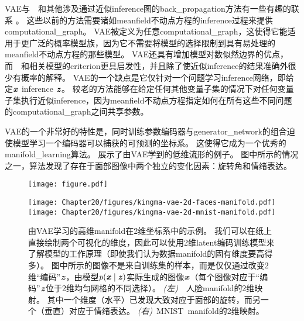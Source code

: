 \gls{VAE}与~~和其他涉及通过近似\gls{inference}图的\gls{back_propagation}方法有一些有趣的联系 \citep{Goodfellow-et-al-NIPS2013,Stoyanov2011,brakel13a}。
这些以前的方法需要诸如\gls{meanfield}不动点方程的\gls{inference}过程来提供\gls{computational_graph}。
\gls{VAE}被定义为任意\gls{computational_graph}，这使得它能适用于更广泛的概率模型族，因为它不需要将模型的选择限制到具有易处理的\gls{meanfield}不动点方程的那些模型。
\gls{VAE}还具有增加模型对数似然边界的优点，而~~和相关模型的\gls{criterion}更具启发性，并且除了使近似\gls{inference}的结果准确外很少有概率的解释。
\gls{VAE}的一个缺点是它仅针对一个问题学习\gls{inference}网络，即给定$\boldsymbol{\mathit{x}}$ \gls{inference} $\boldsymbol{\mathit{z}}$。
较老的方法能够在给定任何其他变量子集的情况下对任何变量子集执行近似\gls{inference}，因为\gls{meanfield}不动点方程指定如何在所有这些不同问题的\gls{computational_graph}之间共享参数。


\gls{VAE}的一个非常好的特性是，同时训练参数编码器与\gls{generator_network}的组合迫使模型学习一个编码器可以捕获的可预测的坐标系。
这使得它成为一个优秀的\gls{manifold_learning}算法。
展示了由\gls{VAE}学到的低维流形的例子。
图中所示的情况之一，算法发现了存在于面部图像中两个独立的变化因素：旋转角和情绪表达。


\begin{figure}[!htb]
\ifOpenSource
\centerline{\texttt{[image: figure.pdf]}}
\else
\centerline{
\texttt{[image: Chapter20/figures/kingma-vae-2d-faces-manifold.pdf]}
\texttt{[image: Chapter20/figures/kingma-vae-2d-mnist-manifold.pdf]}
}
\fi
\caption{由\gls{VAE}学习的高维\gls{manifold}在2维坐标系中的示例\citep{Kingma+Welling-ICLR2014}。
我们可以在纸上直接绘制两个可视化的维度，因此可以使用2维\gls{latent}编码训练模型来了解模型的工作原理（即使我们认为数据\gls{manifold}的固有维度要高得多）。
图中所示的图像不是来自训练集的样本，而是仅仅通过改变2维``编码''$\boldsymbol{\mathit{z}}$，由模型$p(\boldsymbol{\mathit{x}} \mid \boldsymbol{\mathit{z}})$实际生成的图像$\boldsymbol{\mathit{x}}$（每个图像对应于``编码''$\boldsymbol{\mathit{z}}$位于2维均匀网格的不同选择）。
\emph{(左)}~~人脸\gls{manifold}的2维映射。 其中一个维度（水平）已发现大致对应于面部的旋转，而另一个（垂直）对应于情绪表达。
\emph{(右)}~MNIST~\gls{manifold}的2维映射。
}
\label{fig:chap20_kingma-vae-2d-faces-manifold}
\end{figure}

\subsection{}
\label{sec:generative_adversarial_networks}

